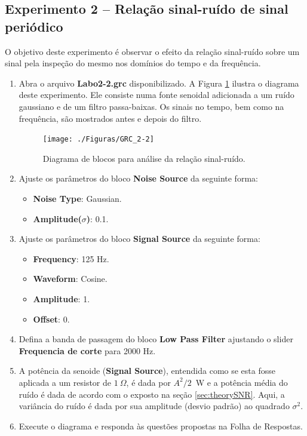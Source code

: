 \documentclass[12pt,addpoints]{exam}
\begin{document}
\subsection{Experimento 2 -- Relação sinal-ruído de sinal periódico}

O objetivo deste experimento é observar o efeito da relação sinal-ruído sobre um sinal pela inspeção do mesmo nos domínios do tempo e da frequência.

\begin{enumerate}
    \item Abra o arquivo \textbf{Labo2-2.grc} disponibilizado. A Figura \ref{fig:GRC_2-2a} ilustra o diagrama deste experimento. Ele consiste numa fonte senoidal adicionada a um ruído gaussiano e de um filtro passa-baixas. Os sinais no tempo, bem como na frequência, são mostrados antes e depois do filtro.
    \begin{figure}[htb]
        \centering
        \texttt{[image: ./Figuras/GRC\_2-2]}
        \caption{Diagrama de blocos para análise da relação sinal-ruído.} 
        \label{fig:GRC_2-2a}
    \end{figure}
    \item Ajuste os parâmetros do bloco \textbf{Noise Source} da seguinte forma:
    \begin{itemize}
        \item \textbf{Noise Type}: Gaussian.
        \item \textbf{Amplitude($\sigma$)}: 0.1.
    \end{itemize}
    \item Ajuste os parâmetros do bloco \textbf{Signal Source} da seguinte forma:
    \begin{itemize}
        \item \textbf{Frequency}: 125 Hz.
        \item \textbf{Waveform}: Cosine.
        \item \textbf{Amplitude}: 1.
        \item \textbf{Offset}: 0.
    \end{itemize}
    \item Defina a banda de passagem do bloco \textbf{Low Pass Filter} ajustando o slider \textbf{Frequencia de corte} para 2000 Hz.
    \item A potência da senoide (\textbf{Signal Source}), entendida como se esta fosse aplicada a um resistor de $1~\Omega$, é dada por $A^2/2$~W e a potência média do ruído é dada de acordo com o exposto na seção \ref{sec:theorySNR}. Aqui, a variância do ruído é dada por sua amplitude (desvio padrão) ao quadrado $\sigma^2$.
    \item Execute o diagrama e responda às questões propostas na Folha de Respostas.
\end{enumerate}
\end{document}
